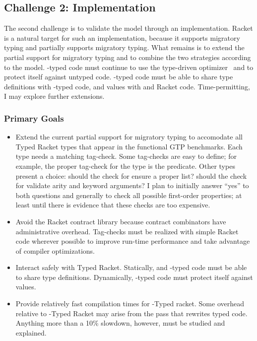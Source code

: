 \subsection{Challenge 2: Implementation}

The second challenge is to validate the model through an implementation.
Racket is a natural target for such an implementation, because it supports
 \tdeep{} migratory typing and partially supports \tshallow{} migratory typing.
What remains is to extend the partial support for \tshallow{} migratory typing
 and to combine the two strategies according to the model.
\tDeep{}-typed code must continue to use the type-driven optimizer~\cite{stff-padl-2012}
 and to protect itself against untyped code.
\tShallow{}-typed code must be able to share type definitions with
 \tdeep{}-typed code, and values with \tdeep{} and Racket code.
Time-permitting, I may explore further extensions.


\subsubsection{Primary Goals}

\begin{itemize}
  \item
    Extend the current partial support for \tshallow{} migratory typing
     to accomodate all Typed Racket types that appear in the functional GTP
     benchmarks.
    Each type needs a matching tag-check.
    Some tag-checks are easy to define; for example, the proper tag-check for
     the  type is the  predicate.
    Other types present a choice:
     should the check for  ensure a proper list?
     should the check for \racketcode{->*} validate arity and keyword arguments?
    I plan to initially answer ``yes'' to both questions and generally to check
     all possible first-order properties; at least until there is evidence
     that these checks are too expensive.
  \item
    Avoid the Racket contract library
    because contract combinators have administrative overhead.
    Tag-checks must be realized with simple Racket code wherever possible to
     improve run-time performance and take advantage of compiler optimizations.
  \item
    Interact safely with Typed Racket.
    Statically, \tshallow{} and \tdeep{}-typed code must be able to share type definitions.
    Dynamically, \tdeep{}-typed code must protect itself against \tshallow{} values.
  \item
    Provide relatively fast compilation times for \tshallow{}-Typed racket.
    Some overhead relative to \tdeep{}-Typed Racket may arise from the pass that
    rewrites typed code.
    Anything more than a 10\% slowdown, however, must be studied and explained.
\end{itemize}


